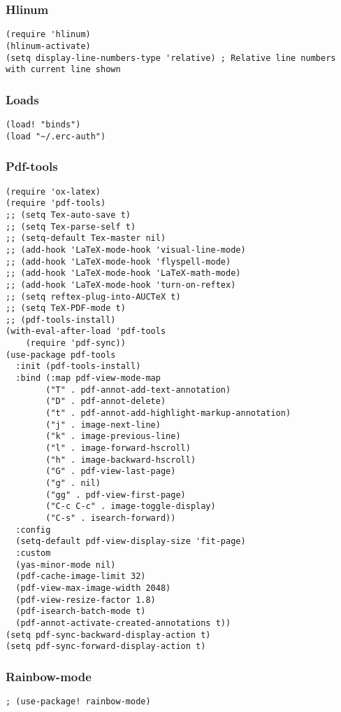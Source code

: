 \documentclass[11pt]{article}
\begin{document}
\subsubsection{Hlinum}
\label{sec:org0af1c1b}
\begin{verbatim}
(require 'hlinum)
(hlinum-activate)
(setq display-line-numbers-type 'relative) ; Relative line numbers with current line shown
\end{verbatim}
\subsubsection{Loads}
\label{sec:org9df151b}
\begin{verbatim}
(load! "binds")
(load "~/.erc-auth")
\end{verbatim}
\subsubsection{Pdf-tools}
\label{sec:org964249e}
\begin{verbatim}
(require 'ox-latex)
(require 'pdf-tools)
;; (setq Tex-auto-save t)
;; (setq Tex-parse-self t)
;; (setq-default Tex-master nil)
;; (add-hook 'LaTeX-mode-hook 'visual-line-mode)
;; (add-hook 'LaTeX-mode-hook 'flyspell-mode)
;; (add-hook 'LaTeX-mode-hook 'LaTeX-math-mode)
;; (add-hook 'LaTeX-mode-hook 'turn-on-reftex)
;; (setq reftex-plug-into-AUCTeX t)
;; (setq TeX-PDF-mode t)
;; (pdf-tools-install)
(with-eval-after-load 'pdf-tools
    (require 'pdf-sync))
(use-package pdf-tools
  :init (pdf-tools-install)
  :bind (:map pdf-view-mode-map
        ("T" . pdf-annot-add-text-annotation)
        ("D" . pdf-annot-delete)
        ("t" . pdf-annot-add-highlight-markup-annotation)
        ("j" . image-next-line)
        ("k" . image-previous-line)
        ("l" . image-forward-hscroll)
        ("h" . image-backward-hscroll)
        ("G" . pdf-view-last-page)
        ("g" . nil)
        ("gg" . pdf-view-first-page)
        ("C-c C-c" . image-toggle-display)
        ("C-s" . isearch-forward))
  :config
  (setq-default pdf-view-display-size 'fit-page)
  :custom
  (yas-minor-mode nil)
  (pdf-cache-image-limit 32)
  (pdf-view-max-image-width 2048)
  (pdf-view-resize-factor 1.8)
  (pdf-isearch-batch-mode t)
  (pdf-annot-activate-created-annotations t))
(setq pdf-sync-backward-display-action t)
(setq pdf-sync-forward-display-action t)
\end{verbatim}
\subsubsection{Rainbow-mode}
\label{sec:orgff7869a}
\begin{verbatim}
; (use-package! rainbow-mode)
\end{verbatim}
\end{document}
